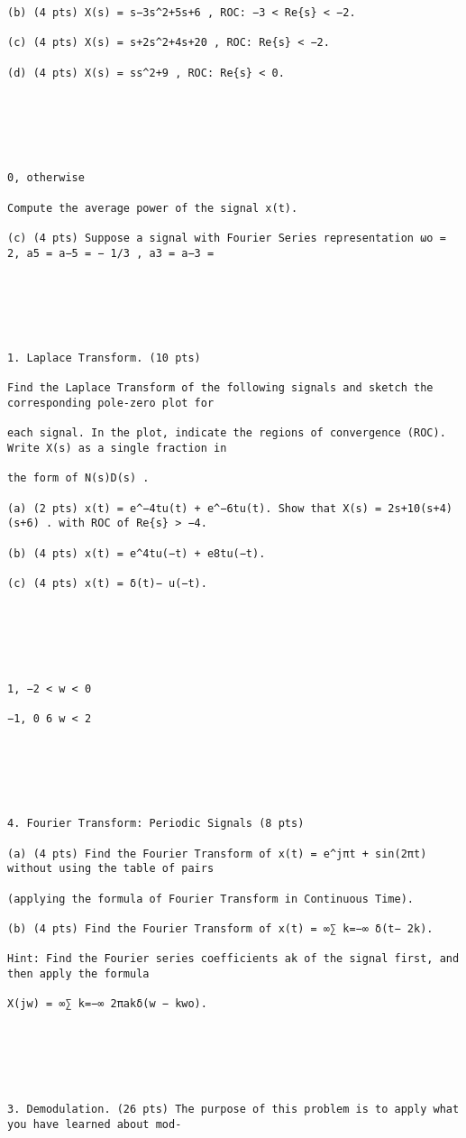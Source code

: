 \documentclass[11pt,addpoints]{exam}
\begin{document}
\begin{verbatim}
(b) (4 pts) X(s) = s−3s^2+5s+6 , ROC: −3 < Re{s} < −2.

(c) (4 pts) X(s) = s+2s^2+4s+20 , ROC: Re{s} < −2.

(d) (4 pts) X(s) = ss^2+9 , ROC: Re{s} < 0.






0, otherwise

Compute the average power of the signal x(t).

(c) (4 pts) Suppose a signal with Fourier Series representation ωo = 2, a5 = a−5 = − 1/3 , a3 = a−3 =






1. Laplace Transform. (10 pts)

Find the Laplace Transform of the following signals and sketch the corresponding pole-zero plot for

each signal. In the plot, indicate the regions of convergence (ROC). Write X(s) as a single fraction in

the form of N(s)D(s) .

(a) (2 pts) x(t) = e^−4tu(t) + e^−6tu(t). Show that X(s) = 2s+10(s+4)(s+6) . with ROC of Re{s} > −4.

(b) (4 pts) x(t) = e^4tu(−t) + e8tu(−t).

(c) (4 pts) x(t) = δ(t)− u(−t).






1, −2 < w < 0

−1, 0 6 w < 2






4. Fourier Transform: Periodic Signals (8 pts)

(a) (4 pts) Find the Fourier Transform of x(t) = e^jπt + sin(2πt) without using the table of pairs

(applying the formula of Fourier Transform in Continuous Time).

(b) (4 pts) Find the Fourier Transform of x(t) = ∞∑ k=−∞ δ(t− 2k).

Hint: Find the Fourier series coefficients ak of the signal first, and then apply the formula

X(jw) = ∞∑ k=−∞ 2πakδ(w − kwo).






3. Demodulation. (26 pts) The purpose of this problem is to apply what you have learned about mod-


\end{verbatim}
\end{document}
